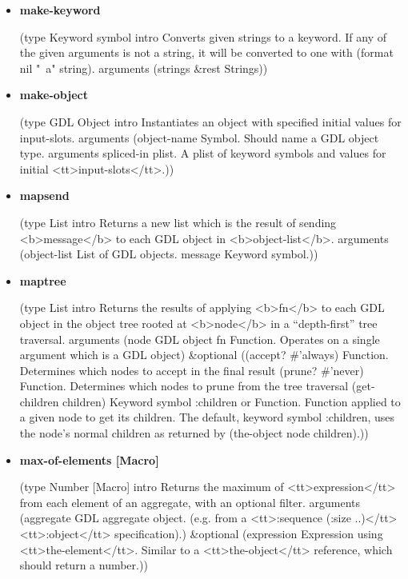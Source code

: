 \documentclass [11pt]{book}
\begin{document}
\begin{itemize}
\item {}
\label{prim:make-keyword}
\textbf{make-keyword}

(type Keyword symbol intro  Converts given strings to a keyword.
If any of the given arguments is not a string, it will be converted to one with
(format nil "~a" string).
 arguments (strings \&rest Strings))



\item {}
\label{prim:make-object}
\textbf{make-object}

(type GDL Object intro
  Instantiates an object with specified initial values for input-slots.
 arguments
 (object-name Symbol. Should name a GDL object type. arguments
  spliced-in plist. A plist of keyword symbols and values for initial <tt>input-slots</tt>.))



\item {}
\label{prim:mapsend}
\textbf{mapsend}

(type List intro
  Returns a new list which is the result of sending <b>message</b> to each GDL
object in <b>object-list</b>.
 arguments (object-list List of GDL objects. message Keyword symbol.))



\item {}
\label{prim:maptree}
\textbf{maptree}

(type List intro
  Returns the results of applying <b>fn</b> to each GDL object in the object
tree rooted at <b>node</b> in a ``depth-first'' tree traversal.
 arguments
 (node GDL object fn
  Function. Operates on a single argument which is a GDL object)
 \&optional
 ((accept? \#'always)
  Function. Determines which nodes to accept in the final result
  (prune? \#'never)
  Function. Determines which nodes to prune from the tree traversal
  (get-children children)
  Keyword symbol :children or Function. Function applied to
a given node to get its children. The default, keyword symbol :children, uses the node's normal
children as returned by (the-object node children).))



\item {}
\label{prim:max-of-elements}
\textbf{max-of-elements [Macro]}

(type Number [Macro] intro
  Returns the maximum of <tt>expression</tt> from each element of an aggregate,
with an optional filter.
 arguments
 (aggregate
  GDL aggregate object. (e.g. from a <tt>:sequence (:size ..)</tt> <tt>:object</tt> specification).)
 \&optional
 (expression
  Expression using <tt>the-element</tt>. Similar to a <tt>the-object</tt> reference, which should return a number.))




\end{itemize}
\end{document}
